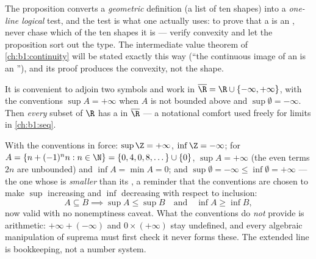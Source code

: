 \begin{remark}
The proposition converts a \emph{geometric} definition (a list
of ten shapes) into a \emph{one-line logical} test, and the test
is what one actually uses: to prove that a  is an ,
never chase which of the ten shapes it is --- verify convexity
and let the proposition sort out the type. The intermediate
value theorem of \cref{ch:b1:continuity} will be stated exactly
this way (``the continuous image of an  is an
''), and its proof produces the convexity, not the
shape.
\end{remark}

\begin{remark}
It is convenient to adjoin two symbols and work in $\overline\R = \R
\cup \{-\infty, +\infty\}$, with the conventions $\sup A = +\infty$
when $A$ is not bounded above and $\sup \emptyset = -\infty$. Then
\emph{every} subset of $\R$ has a  in $\overline\R$ --- a
notational comfort used freely for limits in \cref{ch:b1:seq}.
\end{remark}

\begin{example}\label{ex:b1:reals:extendedcompute}
With the conventions in force: $\sup \Z = +\infty$, $\inf \Z =
-\infty$; for $A = \{n + (-1)^n n : n \in \N\} = \{0, 4, 0, 8,
\dots\} \cup \{0\}$, $\sup A = +\infty$ (the even terms $2n$ are
unbounded) and $\inf A = \min A = 0$; and $\sup\emptyset =
-\infty \leq \inf\emptyset = +\infty$ --- the one  whose
 is \emph{smaller} than its , a reminder that the
conventions are chosen to make $\sup$ increasing and $\inf$
decreasing with respect to inclusion:
\[
A \subseteq B \implies \sup A \leq \sup B
\quad\text{and}\quad \inf A \geq \inf B ,
\]
now valid with no nonemptiness caveat. What the conventions do
\emph{not} provide is arithmetic: $+\infty + (-\infty)$ and $0
\times (+\infty)$ stay undefined, and every algebraic
manipulation of suprema must first check it never forms these.
The extended line is bookkeeping, not a number system.
\end{example}

